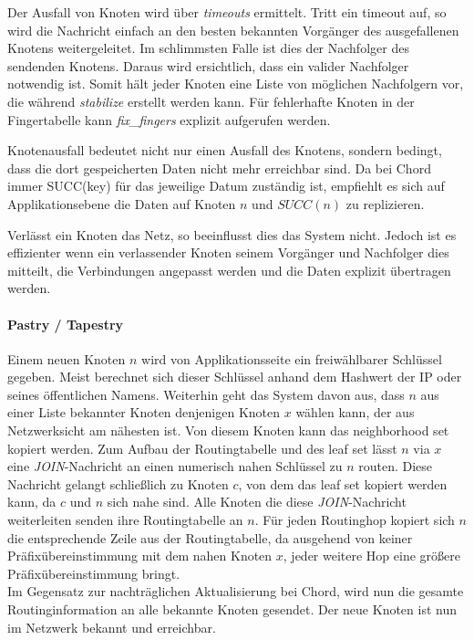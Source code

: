 Der Ausfall von Knoten wird über \emph{timeouts} ermittelt. Tritt ein timeout auf, so wird die Nachricht einfach an den besten bekannten Vorgänger des ausgefallenen Knotens weitergeleitet. Im schlimmsten Falle ist dies der Nachfolger des sendenden Knotens. Daraus wird ersichtlich, dass ein valider Nachfolger notwendig ist. Somit hält jeder Knoten eine Liste von möglichen Nachfolgern vor, die während \emph{stabilize} erstellt werden kann. Für fehlerhafte Knoten in der Fingertabelle kann \emph{fix\_fingers} explizit aufgerufen werden.

Knotenausfall bedeutet nicht nur einen Ausfall des Knotens, sondern bedingt, dass die dort gespeicherten Daten nicht mehr erreichbar sind. Da bei Chord immer SUCC(key) für das jeweilige Datum zuständig ist, empfiehlt es sich auf Applikationsebene die Daten auf Knoten $n$ und $SUCC(n)$ zu replizieren.

Verlässt ein Knoten das Netz, so beeinflusst dies das System nicht. Jedoch ist es effizienter wenn ein verlassender Knoten seinem Vorgänger und Nachfolger dies mitteilt, die Verbindungen angepasst werden und die Daten explizit übertragen werden.

\paragraph{Pastry / Tapestry}
Einem neuen Knoten $n$ wird von Applikationsseite ein freiwählbarer Schlüssel gegeben. Meist berechnet sich dieser Schlüssel anhand dem Hashwert der IP oder seines öffentlichen Namens. Weiterhin geht das System davon aus, dass $n$ aus einer Liste bekannter Knoten denjenigen Knoten $x$ wählen kann, der aus Netzwerksicht am nähesten ist. Von diesem Knoten kann das neighborhood set kopiert werden. Zum Aufbau der Routingtabelle und des leaf set lässt $n$ via $x$ eine \emph{JOIN}-Nachricht an einen numerisch nahen Schlüssel zu $n$ routen. Diese Nachricht gelangt schließlich zu Knoten $c$, von dem das leaf set kopiert werden kann, da $c$ und $n$ sich nahe sind. Alle Knoten die diese \emph{JOIN}-Nachricht weiterleiten senden ihre Routingtabelle an $n$. Für jeden Routinghop kopiert sich $n$ die entsprechende Zeile aus der Routingtabelle, da ausgehend von keiner Präfixübereinstimmung mit dem nahen Knoten $x$, jeder weitere Hop eine größere Präfixübereinstimmung bringt.\\
Im Gegensatz zur nachträglichen Aktualisierung bei Chord, wird nun die gesamte Routinginformation an alle bekannte Knoten gesendet. Der neue Knoten ist nun im Netzwerk bekannt und erreichbar.

